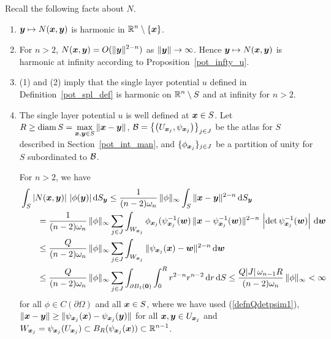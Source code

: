Recall the following facts about $N$.
\begin{enumerate}
\item ${\bm{y}}\mapsto N({\bm{x}},{\bm{y}})$ is harmonic in
$\displaystyle \mathbb{R}^n \setminus \{ {\bm{x}} \}$.
\item For $n>2$,
$\displaystyle N({\bm{x}},{\bm{y}}) = O(\|{\bm{y}}\|^{2-n})$ as
$\|{\bm{y}}\|\rightarrow \infty$.  Hence ${\bm{y}} \mapsto N({\bm{x}},{\bm{y}})$
is harmonic at infinity according to Proposition~\ref{pot_infty_u}.
\item (1) and (2) imply that the
single layer potential $u$ defined in Definition~\ref{pot_spl_def} is
harmonic on $\displaystyle \mathbb{R}^n \setminus S$ and at infinity for $n>2$. 
\item The single layer potential $u$ is well defined at ${\bm{x}} \in S$.
Let $\displaystyle R \geq \operatorname{diam} S
= \max_{{\bm{x}},{\bm{y}} \in S} \|{\bm{x}}-{\bm{y}}\|$,
$\displaystyle \mathcal{B} = \left\{ \left(U_{{\bm{x}}_j},
\psi_{{\bm{x}}_j}\right) \right \}_{j\in J}$ be the atlas for
$S$ described in Section~\ref{pot_int_man}, and
$\displaystyle \{ \phi_{{\bm{x}}_j} \}_{j\in J}$ be a partition of unity 
for $S$ subordinated to $\mathcal{B}$.

For $n>2$, we have
\begin{align*}
&\int_S \left| N({\bm{x}},{\bm{y}}) \right|\, |\phi({\bm{y}})| \,\mathrm{d}{S}_{{\bm{y}}}
\leq \frac{1}{(n-2)\omega_n} \, \|\phi\|_\infty
\int_S \|{\bm{x}}-{\bm{y}}\|^{2-n} \,\mathrm{d}{S}_{{\bm{y}}} \\
&\qquad = \frac{1}{(n-2)\omega_n} \, \|\phi\|_\infty
\sum_{j\in J} \int_{W_{{\bm{x}}_j}}
\phi_{{\bm{x}}_j}(\psi_{{\bm{x}}_j}^{-1}({\bm{w}})\,
\|{\bm{x}}-\psi_{{\bm{x}}_j}^{-1}({\bm{w}})\|^{2-n}
\,\left|\det\psi_{{\bm{x}}_j}^{-1}({\bm{w}})\right| \,\mathrm{d}{{\bm{w}}} \\
&\qquad \leq \frac{Q}{(n-2)\omega_n} \, \|\phi\|_\infty
\sum_{j\in J} \int_{W_{{\bm{x}}_j} }
\|\psi_{{\bm{x}}_j}({\bm{x}})-{\bm{w}}\|^{2-n}\,\mathrm{d}{{\bm{w}}} \\
&\qquad \leq \frac{Q}{(n-2)\omega_n} \, \|\phi\|_\infty
\sum_{j\in J} \int_{\partial B_1({\bm{0}})} \int_0^R
  r^{2-n} r^{n-2} \,\mathrm{d}{r} \,\mathrm{d}{S}
\leq \frac{Q |J|\, \omega_{n-1} R}{(n-2)\omega_n} \, \|\phi\|_\infty
< \infty
\end{align*}
for all $\phi\in C(\partial \Omega)$ and all ${\bm{x}} \in S$, where we
have used (\ref{defnQdetpsim1}), $\displaystyle \|{\bm{x}}-{\bm{y}}\| 
\geq \|\psi_{{\bm{x}}_j}({\bm{x}}) - \psi_{{\bm{x}}_j}({\bm{y}})\|$ for all
$\displaystyle {\bm{x}},{\bm{y}} \in U_{{\bm{x}}_j}$ and
$\displaystyle W_{{\bm{x}}_j} = \psi_{{\bm{x}}_j}(U_{{\bm{x}}_j}) \subset
B_R(\psi_{{\bm{x}}_j}({\bm{x}})) \subset \mathbb{R}^{n-1}$.


\end{enumerate}
